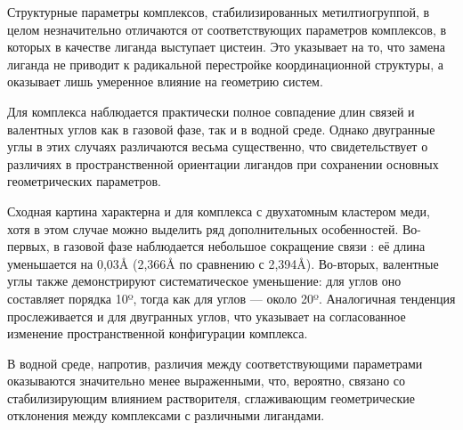 \documentclass[a4paper,12pt]{article}
\begin{document}
\begin{onehalfspace}
	Структурные параметры комплексов, стабилизированных метилтиогруппой, в целом незначительно отличаются от соответствующих параметров комплексов, в которых в качестве лиганда выступает цистеин. Это указывает на то, что замена лиганда не приводит к радикальной перестройке координационной структуры, а оказывает лишь умеренное влияние на геометрию систем.
	
	Для комплекса  наблюдается практически полное совпадение длин связей и валентных углов как в газовой фазе, так и в водной среде. Однако двугранные углы в этих случаях различаются весьма существенно, что свидетельствует о различиях в пространственной ориентации лигандов при сохранении основных геометрических параметров.
	
	Сходная картина характерна и для комплекса с двухатомным кластером меди, хотя в этом случае можно выделить ряд дополнительных особенностей. Во-первых, в газовой фазе наблюдается небольшое сокращение связи : её длина уменьшается на 0,03Å (2,366Å по сравнению с 2,394Å). Во-вторых, валентные углы также демонстрируют систематическое уменьшение: для углов  оно составляет порядка 10º, тогда как для углов  — около 20º. Аналогичная тенденция прослеживается и для двугранных углов, что указывает на согласованное изменение пространственной конфигурации комплекса.
	
	В водной среде, напротив, различия между соответствующими параметрами оказываются значительно менее выраженными, что, вероятно, связано со стабилизирующим влиянием растворителя, сглаживающим геометрические отклонения между комплексами с различными лигандами.
	

\end{onehalfspace}
\end{document}
